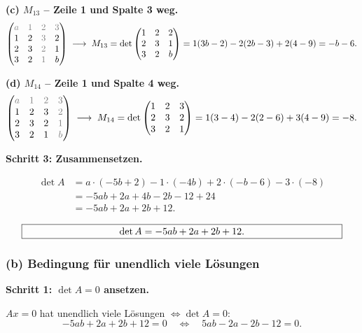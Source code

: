 \documentclass[a4paper,12pt]{article}
\begin{document}
\textbf{(c) $M_{13}$ -- Zeile 1 und Spalte 3 weg.}
\[
\begin{pmatrix}
\color{gray}a & \color{gray}1 & \color{gray}2 & \color{gray}3 \\
1 & 2 & \color{gray}3 & 2 \\
2 & 3 & \color{gray}2 & 1 \\
3 & 2 & \color{gray}1 & b
\end{pmatrix}
\;\longrightarrow\;
M_{13} = \det \begin{pmatrix} 1 & 2 & 2 \\ 2 & 3 & 1 \\ 3 & 2 & b \end{pmatrix}
= 1(3b - 2) - 2(2b - 3) + 2(4 - 9)
= -b - 6.
\]

\textbf{(d) $M_{14}$ -- Zeile 1 und Spalte 4 weg.}
\[
\begin{pmatrix}
\color{gray}a & \color{gray}1 & \color{gray}2 & \color{gray}3 \\
1 & 2 & 3 & \color{gray}2 \\
2 & 3 & 2 & \color{gray}1 \\
3 & 2 & 1 & \color{gray}b
\end{pmatrix}
\;\longrightarrow\;
M_{14} = \det \begin{pmatrix} 1 & 2 & 3 \\ 2 & 3 & 2 \\ 3 & 2 & 1 \end{pmatrix}
= 1(3 - 4) - 2(2 - 6) + 3(4 - 9)
= -8.
\]

\textbf{Schritt 3: Zusammensetzen.}

\begin{align*}
\det A &= a \cdot (-5b+2) - 1 \cdot (-4b) + 2 \cdot (-b - 6) - 3 \cdot (-8) \\
&= -5ab + 2a + 4b - 2b - 12 + 24 \\
&= -5ab + 2a + 2b + 12.
\end{align*}

\[
\fbox{\parbox{0.93\textwidth}{\centering
$\det A = -5ab + 2a + 2b + 12$.
}}
\]

\subsubsection*{(b) Bedingung f\"ur unendlich viele L\"osungen}

\textbf{Schritt 1: $\det A = 0$ ansetzen.}

$Ax = 0$ hat unendlich viele L\"osungen $\iff \det A = 0$:
\[
-5ab + 2a + 2b + 12 = 0 \quad\iff\quad 5ab - 2a - 2b - 12 = 0.
\]
\end{document}

